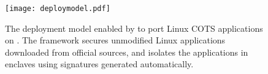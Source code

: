 

\begin{figure}[t!]
\centering
\texttt{[image: deploymodel.pdf]}
\vspace{-5pt}
\caption{The deployment model enabled by \graphenesgx{} to port Linux COTS applications on \sgx{}.
The framework secures unmodified Linux applications downloaded from official sources, and isolates the applications in enclaves using signatures generated automatically. }
\label{fig:deploy-model}
\end{figure}



